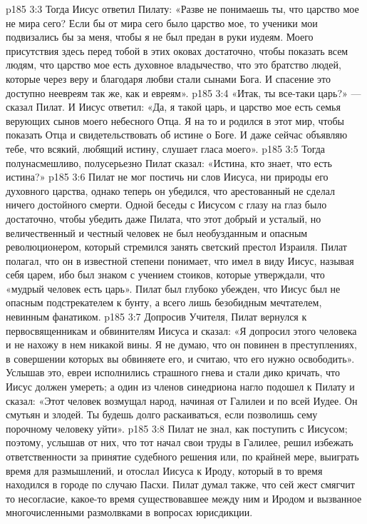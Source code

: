 \vs p185 3:3 Тогда Иисус ответил Пилату: «Разве не понимаешь ты, что царство мое не мира сего? Если бы от мира сего было царство мое, то ученики мои подвизались бы за меня, чтобы я не был предан в руки иудеям. Моего присутствия здесь перед тобой в этих оковах достаточно, чтобы показать всем людям, что царство мое есть духовное владычество, что это братство людей, которые через веру и благодаря любви стали сынами Бога. И спасение это доступно неевреям так же, как и евреям».
\vs p185 3:4 «Итак, ты все\hyp{}таки царь?» --- сказал Пилат. И Иисус ответил: «Да, я такой царь, и царство мое есть семья верующих сынов моего небесного Отца. Я на то и родился в этот мир, чтобы показать Отца и свидетельствовать об истине о Боге. И даже сейчас объявляю тебе, что всякий, любящий истину, слушает гласа моего».
\vs p185 3:5 Тогда полунасмешливо, полусерьезно Пилат сказал: «Истина, кто знает, что есть истина?»
\vs p185 3:6 Пилат не мог постичь ни слов Иисуса, ни природы его духовного царства, однако теперь он убедился, что арестованный не сделал ничего достойного смерти. Одной беседы с Иисусом с глазу на глаз было достаточно, чтобы убедить даже Пилата, что этот добрый и усталый, но величественный и честный человек не был необузданным и опасным революционером, который стремился занять светский престол Израиля. Пилат полагал, что он в известной степени понимает, что имел в виду Иисус, называя себя царем, ибо был знаком с учением стоиков, которые утверждали, что «мудрый человек есть царь». Пилат был глубоко убежден, что Иисус был не опасным подстрекателем к бунту, а всего лишь безобидным мечтателем, невинным фанатиком.
\vs p185 3:7 Допросив Учителя, Пилат вернулся к первосвященникам и обвинителям Иисуса и сказал: «Я допросил этого человека и не нахожу в нем никакой вины. Я не думаю, что он повинен в преступлениях, в совершении которых вы обвиняете его, и считаю, что его нужно освободить». Услышав это, евреи исполнились страшного гнева и стали дико кричать, что Иисус должен умереть; а один из членов синедриона нагло подошел к Пилату и сказал: «Этот человек возмущал народ, начиная от Галилеи и по всей Иудее. Он смутьян и злодей. Ты будешь долго раскаиваться, если позволишь сему порочному человеку уйти».
\vs p185 3:8 Пилат не знал, как поступить с Иисусом; поэтому, услышав от них, что тот начал свои труды в Галилее, решил избежать ответственности за принятие судебного решения или, по крайней мере, выиграть время для размышлений, и отослал Иисуса к Ироду, который в то время находился в городе по случаю Пасхи. Пилат думал также, что сей жест смягчит то несогласие, какое\hyp{}то время существовавшее между ним и Иродом и вызванное многочисленными размолвками в вопросах юрисдикции.
